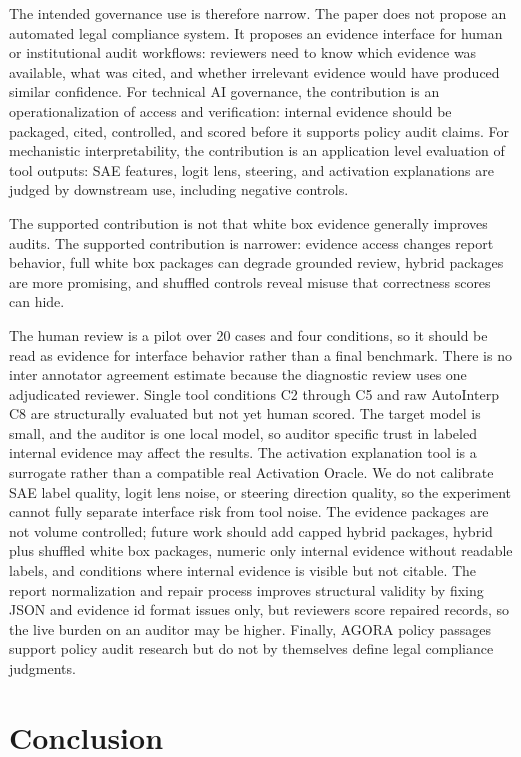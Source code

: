 \documentclass{article}
\begin{document}
The intended governance use is therefore narrow. The paper does not propose an automated legal compliance system. It proposes an evidence interface for human or institutional audit workflows: reviewers need to know which evidence was available, what was cited, and whether irrelevant evidence would have produced similar confidence. For technical AI governance, the contribution is an operationalization of access and verification: internal evidence should be packaged, cited, controlled, and scored before it supports policy audit claims. For mechanistic interpretability, the contribution is an application level evaluation of tool outputs: SAE features, logit lens, steering, and activation explanations are judged by downstream use, including negative controls.

The supported contribution is not that white box evidence generally improves audits. The supported contribution is narrower: evidence access changes report behavior, full white box packages can degrade grounded review, hybrid packages are more promising, and shuffled controls reveal misuse that correctness scores can hide.

The human review is a pilot over 20 cases and four conditions, so it should be read as evidence for interface behavior rather than a final benchmark. There is no inter annotator agreement estimate because the diagnostic review uses one adjudicated reviewer. Single tool conditions C2 through C5 and raw AutoInterp C8 are structurally evaluated but not yet human scored. The target model is small, and the auditor is one local model, so auditor specific trust in labeled internal evidence may affect the results. The activation explanation tool is a surrogate rather than a compatible real Activation Oracle. We do not calibrate SAE label quality, logit lens noise, or steering direction quality, so the experiment cannot fully separate interface risk from tool noise. The evidence packages are not volume controlled; future work should add capped hybrid packages, hybrid plus shuffled white box packages, numeric only internal evidence without readable labels, and conditions where internal evidence is visible but not citable. The report normalization and repair process improves structural validity by fixing JSON and evidence id format issues only, but reviewers score repaired records, so the live burden on an auditor may be higher. Finally, AGORA policy passages support policy audit research but do not by themselves define legal compliance judgments.

\section{Conclusion}
\end{document}
